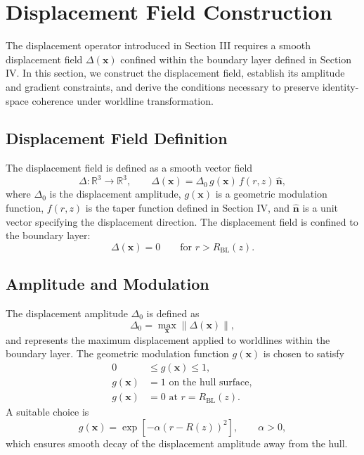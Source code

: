 \documentclass[aip,adv,reprint,floatfix]{revtex4-2}
\begin{document}
\section{Displacement Field Construction}

The displacement operator introduced in Section III requires a smooth displacement field $\Delta(\mathbf{x})$ confined within the boundary layer defined in Section IV. In this section, we construct the displacement field, establish its amplitude and gradient constraints, and derive the conditions necessary to preserve identity-space coherence under worldline transformation.

\subsection{Displacement Field Definition}

The displacement field is defined as a smooth vector field
\begin{equation}
\Delta : \mathbb{R}^3 \rightarrow \mathbb{R}^3,
\qquad
\Delta(\mathbf{x}) = \Delta_0 \, g(\mathbf{x}) \, f(r,z) \, \hat{\mathbf{n}},
\end{equation}
where $\Delta_0$ is the displacement amplitude, $g(\mathbf{x})$ is a geometric modulation function, $f(r,z)$ is the taper function defined in Section IV, and $\hat{\mathbf{n}}$ is a unit vector specifying the displacement direction. The displacement field is confined to the boundary layer:
\begin{equation}
\Delta(\mathbf{x}) = 0
\qquad
\text{for } r > R_{\mathrm{BL}}(z).
\end{equation}

\subsection{Amplitude and Modulation}

The displacement amplitude $\Delta_0$ is defined as
\begin{equation}
\Delta_0 = \max_{\mathbf{x}} \left\| \Delta(\mathbf{x}) \right\|,
\end{equation}
and represents the maximum displacement applied to worldlines within the boundary layer. The geometric modulation function $g(\mathbf{x})$ is chosen to satisfy
\begin{align}
0 &\leq g(\mathbf{x}) \leq 1, \\
g(\mathbf{x}) &= 1 \text{ on the hull surface}, \\
g(\mathbf{x}) &= 0 \text{ at } r = R_{\mathrm{BL}}(z).
\end{align}
A suitable choice is
\begin{equation}
g(\mathbf{x}) = \exp\left[ -\alpha \left( r - R(z) \right)^2 \right],
\qquad
\alpha > 0,
\end{equation}
which ensures smooth decay of the displacement amplitude away from the hull.
\end{document}
